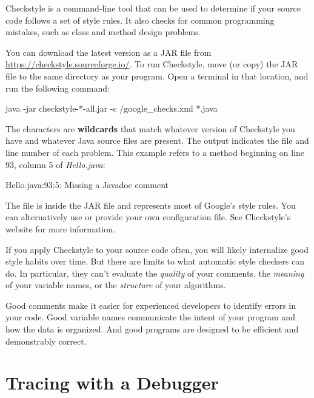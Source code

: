 
Checkstyle is a command-line tool that can be used to determine if your source code follows a set of style rules.
It also checks for common programming mistakes, such as class and method design problems.

You can download the latest version as a JAR file from \url{https://checkstyle.sourceforge.io/}.
To run Checkstyle, move (or copy) the JAR file to the same directory as your program.
Open a terminal in that location, and run the following command:

\begin{stdout}
java -jar checkstyle-*-all.jar -c /google_checks.xml *.java
\end{stdout}


The {\tt *} characters are {\bf wildcards} that match whatever version of Checkstyle you have and whatever Java source files are present.
The output indicates the file and line number of each problem.
This example refers to a method beginning on line 93, column 5 of {\it Hello.java}:

\begin{stdout}
Hello.java:93:5: Missing a Javadoc comment
\end{stdout}

The file  is inside the JAR file and represents most of Google's style rules.
You can alternatively use  or provide your own configuration file.
See Checkstyle's website for more information.

If you apply Checkstyle to your source code often, you will likely internalize good style habits over time.
But there are limits to what automatic style checkers can do.
In particular, they can't evaluate the {\em quality} of your comments, the {\em meaning} of your variable names, or the {\em structure} of your algorithms.

Good comments make it easier for experienced developers to identify errors in your code.
Good variable names communicate the intent of your program and how the data is organized.
And good programs are designed to be efficient and demonstrably correct.


\section{Tracing with a Debugger}
\label{debugger}


